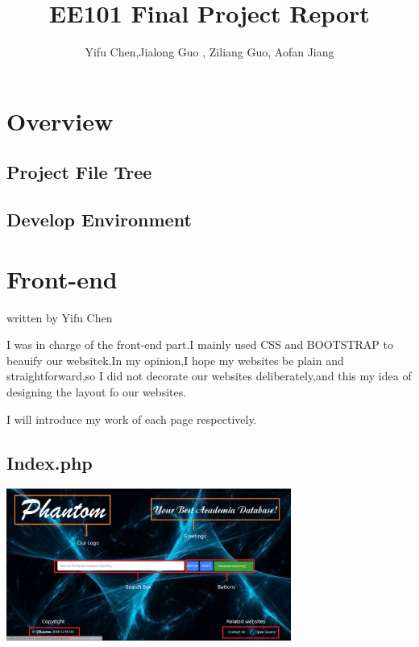 \documentclass[10pt,twoside,a4paper,titlepage]{article}
\title{EE101 Final Project Report}
\author{Yifu Chen,Jialong Guo , Ziliang Guo, Aofan Jiang}
\begin{document}
\maketitle
\phantom{s}
\thispagestyle{empty}
\clearpage

\tableofcontents
\thispagestyle{empty}
\newpage
\setcounter{page}{1}

\section{Overview}
\subsection{Project File Tree}

\subsection{Develop Environment}


\section{Front-end}
written by Yifu Chen
	
	I was in charge of the front-end part.I mainly used CSS and BOOTSTRAP to beauify our websitek.In my opinion,I hope my websites be plain and straightforward,so I did not decorate our websites deliberately,and this my idea of designing the layout fo our websites.
	
	I will introduce my work of each page respectively.
	
	
	\subsection{Index.php}
	
	\includegraphics[width=0.7\textwidth]{cyf/index_structure.PNG}
	
\end{document}
